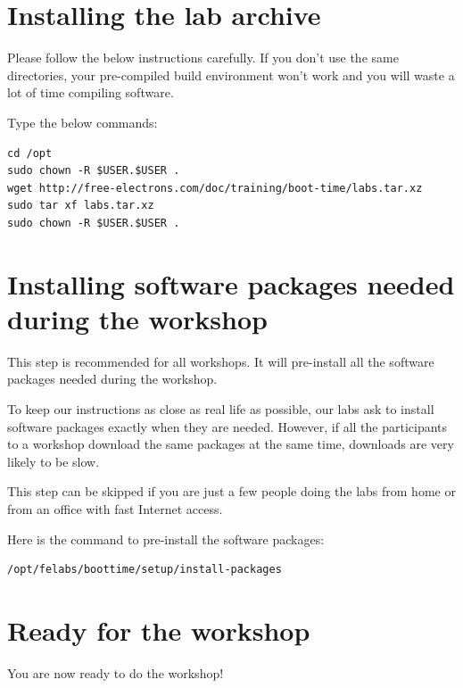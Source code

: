 \section{Installing the lab archive}

Please follow the below instructions carefully. If you don't use the
same directories, your pre-compiled build environment won't work and 
you will waste a lot of time compiling software.

Type the below commands:
\begin{verbatim}
cd /opt
sudo chown -R $USER.$USER .
wget http://free-electrons.com/doc/training/boot-time/labs.tar.xz
sudo tar xf labs.tar.xz
sudo chown -R $USER.$USER .
\end{verbatim}

\section{Installing software packages needed during the workshop}

This step is recommended for all workshops. It will pre-install all the
software packages needed during the workshop.

To keep our instructions as close as real life as possible, our labs
ask to install software packages exactly when they are needed. However,
if all the participants to a workshop download the same packages at the
same time, downloads are very likely to be slow.

This step can be skipped if you are just a few people doing the labs
from home or from an office with fast Internet access.

Here is the command to pre-install the software packages:

\begin{verbatim}
/opt/felabs/boottime/setup/install-packages
\end{verbatim}

\section{Ready for the workshop}

You are now ready to do the workshop!
